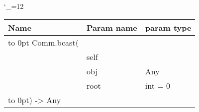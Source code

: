 \begingroup \catcode`\_=12 \tt
\begin{tabular}{lll}
\toprule
\textrm{Name}&\textrm{Param name}&\textrm{param type}\\
\midrule
\hbox to 0pt {Comm.bcast(\hss}\\
& self\\
& obj & Any\\
& root & int = 0\\
\hbox to 0pt{) -> Any\hss}\\
\bottomrule
\end{tabular}
\endgroup
